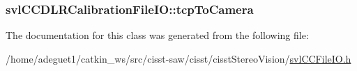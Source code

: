 \hypertarget{classsvl_c_c_d_l_r_calibration_file_i_o_ac4ceadd11cc10224168d3826060d7ceb}{
\subsubsection[{tcp\-To\-Camera}]{ svl\-C\-C\-D\-L\-R\-Calibration\-File\-I\-O\-::tcp\-To\-Camera}}\label{classsvl_c_c_d_l_r_calibration_file_i_o_ac4ceadd11cc10224168d3826060d7ceb}


The documentation for this class was generated from the following file\-:\begin{DoxyCompactItemize}
\item 
/home/adeguet1/catkin\-\_\-ws/src/cisst-\/saw/cisst/cisst\-Stereo\-Vision/\hyperlink{svl_c_c_file_i_o_8h}{svl\-C\-C\-File\-I\-O.\-h}\end{DoxyCompactItemize}
